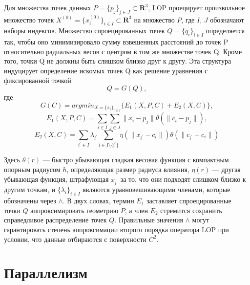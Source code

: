 Для множества точек данных $P = \{p_j\}_{j\in J} \subset \mathbf R^{3}$, LOP проецирует произвольное множество точек $X^{(0)} = \{x_i^{(0)} \} _{i \in I} \subset \mathbf R^{3}$ на множество $P$, где $I$, $J$ обозначают наборы индексов. Множество спроецированных точек $Q = \{q_i\}_{i\in I}$ определяется так, чтобы оно минимизировало сумму взвешенных расстояний до точек P относительно радиальных весов с центром в том же множестве точек Q. Кроме того, точки Q не должны быть слишком близко друг к другу. Эта структура индуцирует определение искомых точек Q как решение уравнения с фиксированной точкой 
$$Q = G(Q),$$
где
$$G(C) = argmin_{X = \{x_i\}_{i \in I}} \{E_1(X,P,C) + E_2(X,C)\},$$
$$E_1(X,P,C) = \sum_{i \in I} \sum_{j \in J}\parallel x_i - p_j \parallel \theta(\parallel c_i - p_j \parallel), $$ 
$$E_2(X, C) = \sum _{i^{'} \in I} \lambda_{i^{'}}\sum_{i \in I \setminus\{i^{'}\}} \eta(\parallel x_{i^{'}}- c_i  \parallel)\theta(\parallel c_{i^{'}} - c_i \parallel)$$

Здесь $\theta(r)$ — быстро убывающая гладкая весовая функция с компактным опорным радиусом $h$, определяющая размер радиуса влияния, $\eta(r)$ — другая убывающая функция, штрафующая $x_{i^{'}}$ за то, что они подходят слишком близко к другим точкам, и $\{\lambda_i\}_{i \in I}$ являются уравновешивающими членами, которые обозначены через $\mathbf \land$. В двух словах, термин $E_1$ заставляет спроецированные точки $Q$ аппроксимировать геометрию $P$, а член $E_2$ стремится  сохранить справедливое распределение точек $Q$. Правильные значения $\mathbf\land$ могут гарантировать степень аппроксимации второго порядка оператора LOP при условии, что данные отбираются с поверхности $C^{2}$.


\section{Параллелизм}

